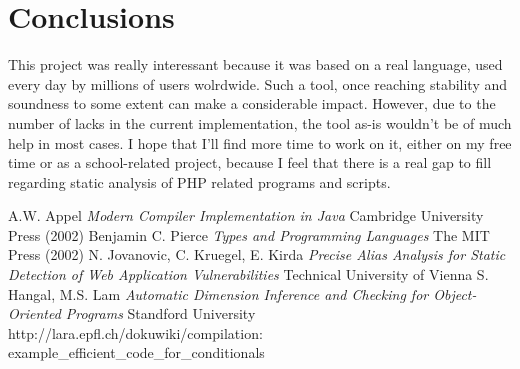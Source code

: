 \documentclass[a4paper]{article}
\begin{document}
\section{Conclusions}
This project was really interessant because it was based on a real language, used
every day by millions of users wolrdwide. Such a tool, once reaching stability
and soundness to some extent can make a considerable impact. However, due to the
number of lacks in the current implementation, the tool as-is wouldn't be of
much help in most cases. I hope that I'll find more time to work on it, either
on my free time or as a school-related project, because I feel that there is a
real gap to fill regarding static analysis of PHP related programs and scripts.

\begin{thebibliography}{99}
  A.W. Appel {\it Modern Compiler Implementation in Java}
    Cambridge University Press (2002)
  Benjamin C. Pierce {\it Types and Programming Languages} The
    MIT Press (2002)
  N. Jovanovic, C. Kruegel, E. Kirda {\it Precise Alias
    Analysis for Static Detection of Web Application Vulnerabilities} Technical
    University of Vienna
  S. Hangal, M.S. Lam {\it Automatic Dimension Inference and
    Checking for Object-Oriented Programs} Standford University
  \mbox{http://lara.epfl.ch/dokuwiki/compilation:}
    \mbox{example\_efficient\_code\_for\_conditionals}
\end{thebibliography}
\end{document}
